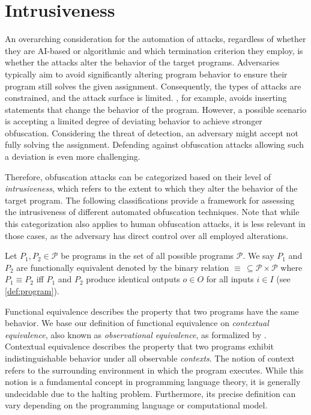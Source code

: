 \section{Intrusiveness}\label{sec:intrusiveness}
An overarching consideration for the automation of attacks, regardless of whether they are AI-based or algorithmic and which termination criterion they employ, is whether the attacks alter the behavior of the target programs. Adversaries typically aim to avoid significantly altering program behavior to ensure their program still solves the given assignment. Consequently, the types of attacks are constrained, and the attack surface is limited.
\mossad, for example, avoids inserting statements that change the behavior of the program.
However, a possible scenario is accepting a limited degree of deviating behavior to achieve stronger obfuscation. Considering the threat of detection, an adversary might accept not fully solving the assignment. Defending against obfuscation attacks allowing such a deviation is even more challenging.

Therefore, obfuscation attacks can be categorized based on their level of \textit{intrusiveness}, which refers to the extent to which they alter the behavior of the target program.
The following classifications provide a framework for assessing the intrusiveness of different automated obfuscation techniques.
Note that while this categorization also applies to human obfuscation attacks, it is less relevant in those cases, as the adversary has direct control over all employed alterations.

\begin{theorem}\label{def:func-eq}
Let \(P_1, P_2 \in \mathcal{P}\) be programs in the set of all possible programs \(\mathcal{P}\). We say \(P_1\) and \(P_2\) are functionally equivalent denoted by the binary relation \(\equiv \, \subseteq \mathcal{P} \times \mathcal{P}\) where \(P_1 \equiv P_2\) iff \(P_1\) and \(P_2\) produce identical outputs \(o \in O\) for all inputs \(i \in I\) (see \autoref{def:program}).
\end{theorem}

Functional equivalence describes the property that two programs have the same behavior.
We base our definition of functional equivalence on \textit{contextual equivalence}, also known as \textit{observational equivalence}, as formalized by \citet{morris1969}. Contextual equivalence describes the property that two programs exhibit indistinguishable behavior under all observable \textit{contexts}. The notion of context refers to the surrounding environment in which the program executes. While this notion is a fundamental concept in programming language theory, it is generally undecidable due to the halting problem. 
Furthermore, its precise definition can vary depending on the programming language or computational model.

